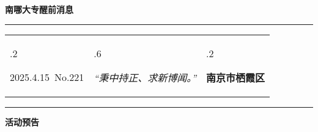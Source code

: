 \documentclass[letterpaper, 12pt]{article}
\begin{document}
\begin{center}
    \Huge\textbf{南哪大专醒前消息}
\end{center}
\vspace{4mm}
\hrule
\renewcommand\tabularxcolumn[1]{m{#1}}
\begin{tabularx}{\textwidth}{>{\hsize.2\hsize}X>{\hsize.6\hsize}X>{\hsize.2\hsize}X}
    \begin{flushleft}
        2025.4.15\, No.221
    \end{flushleft}
    &
    \begin{center}
        \textit{“秉中持正、求新博闻。”}
    \end{center}
    &
    \begin{flushright}
        \textbf{南京市栖霞区}
    \end{flushright}
\end{tabularx}
\vspace{-3.5mm}
\hrule
\vspace{4mm}
\centerline{\huge\textbf{活动预告}}
\end{document}
